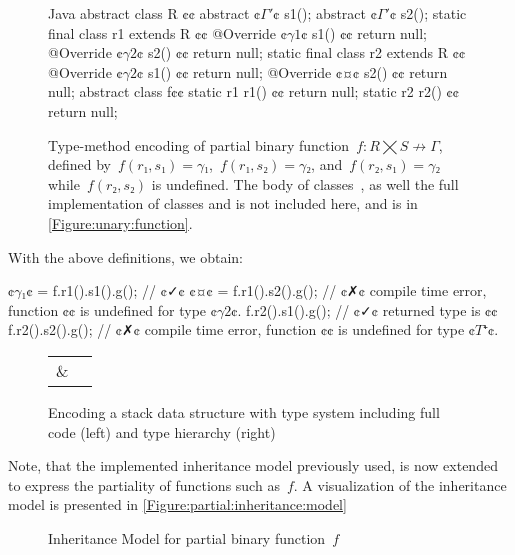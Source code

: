 \begin{figure}[hbt]
  \begin{Code}{Java}
abstract class R {¢¢
  abstract ¢$Γ'$¢ s1();
  abstract ¢$Γ'$¢ s2();
  static final class r1 extends R {¢¢
    @Override ¢$\gamma1$¢ s1() {¢¢ return null; }
    @Override ¢$\gamma2$¢ s2() {¢¢ return null; }
  }
  static final class r2 extends R {¢¢
    @Override ¢$\gamma2$¢ s1() {¢¢ return null; }
    @Override ¢¤¢ s2() {¢¢ return null; }
  }
}
abstract class f{¢¢
  static r1 r1() {¢¢ return null; }
  static r2 r2() {¢¢ return null; }
}
\end{Code}
  \caption{Type-method encoding of partial binary function~$f: R⨉S↛Γ$,
  defined by~$f(r₁,s₁)=γ₁$,~$f(r₁,s₂)=γ₂$, and~$f(r₂,s₁)=γ₂$ while~$f(r₂, s₂)$ is undefined.
  The body of classes~, as well the full implementation of classes  and  is not included here, and is
    in \cref{Figure:unary:function}.}
  \label{Figure:simple:binary}
\end{figure}

With the above definitions, we obtain:
\begin{JAVA}
¢$γ₁$¢ = f.r1().s1().g(); // ¢✓¢
¢¤¢ = f.r1().s2().g(); // ¢✗¢ compile time error, function ¢¢ is undefined for type ¢$\gamma2$¢.
f.r2().s1().g(); // ¢✓¢ returned type is ¢¢
f.r2().s2().g(); // ¢✗¢ compile time error, function ¢¢ is undefined for type ¢$T⁺$¢.
\end{JAVA}

\begin{figure}[h]
    \caption{Encoding a stack data structure with
    \Java type system including full code (left) and type hierarchy (right)}\label{Figure:stack:encoding}
    \begin{tabular}{cc}
         \parbox[c]{0.74\linewidth}{
      }
        &
         \parbox[c]{\hsize}{
          
        }
    \end{tabular}
\end{figure}
      Note, that the implemented inheritance model previously used, is now extended to express the partiality
        of functions such as~$f$. A visualization of the inheritance model is presented in \cref{Figure:partial:inheritance:model}

\begin{figure}[ht]
  \label{Figure:partial:inheritence:model}
  \caption{Inheritance Model for partial binary function~$f$}
  \begin{adjustbox}{max width=0.6\linewidth}
    
  \end{adjustbox}
\end{figure}

